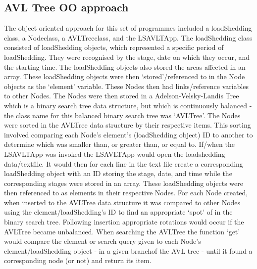 \documentclass[10pt, a4paper]{article}
\begin{document}
        \subsection{AVL Tree OO approach}
        The object oriented approach for this set of programmes included a loadShedding class, a Nodeclass, 
        a AVLTreeclass, and the LSAVLTApp. The loadShedding class consisted of loadShedding objects, which
        represented a specific period of loadShedding. They were recognised by the stage, date on which they occur, 
        and the starting time. The loadShedding objects also stored the areas affected in an array. These 
        loadShedding objects were then ‘stored’/referenced to in the Node objects as the ‘element’ variable. 
        These Nodes then had links/reference variables to other Nodes. The Nodes were then stored in a Adelson-Velsky-Landis 
        Tree which is a binary search tree data structure, but which is continuously balanced - the class name for this 
        balanced binary search tree was ‘AVLTree’. The Nodes were sorted in the AVLTree data structure by their respective
        items. This sorting involved comparing each Node’s element’s (loadShedding object) ID to another to determine which 
        was smaller than, or greater than, or equal to.
        \newline
        \newline
        If/when the LSAVLTApp was invoked the LSAVLTApp would open the loadshedding data/textfile. It would then for
        each line in the text file create a corresponding loadShedding object with an ID storing the stage, date, and time
        while the corresponding stages were stored in an array. These loadShedding objects were then referenced to as
        elements in their respective Nodes. For each Node created, when inserted to the AVLTree data
        structure it was compared to other Nodes using the element/loadShedding's ID to find an appropriate ‘spot’ of in the 
        binary search tree. Following insertion appropriate rotations would occur if the AVLTree became unbalanced. 
        When searching the AVLTree the function ‘get’ would compare the element or search query given to each Node’s 
        element/loadShedding object - in a given branchof the AVL tree - until it found a corresponding node (or not) 
        and return its item.
    
\end{document}
